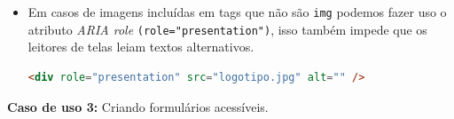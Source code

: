 {\begin{itemize}
\begin{itemize}
\item Em casos de imagens incluídas em tags que não são \lstinline{img} podemos fazer uso o atributo \textit{ARIA role} \cite{WAI-ARIA} \lstinline{(role="presentation")}, isso também impede que os leitores de telas leiam textos alternativos.
{\begin{lstlisting}[language=html,caption=usando atributo role="presentation"]
<div role="presentation" src="logotipo.jpg" alt="" />
\end{lstlisting}}
\end{itemize}


 
\end{itemize}}

{

\vspace{1.5cm}
{\centerline{\textbf{Caso de uso 3:} Criando formulários acessíveis.} }


}
